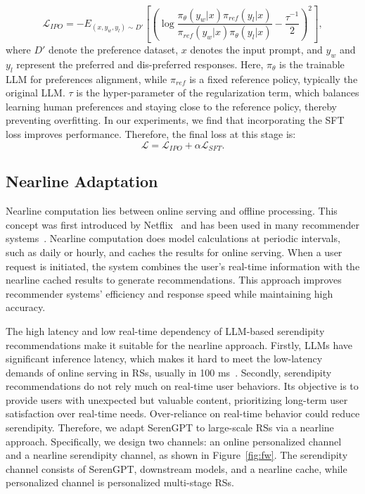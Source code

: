 \begin{equation}
    \mathcal{L}_{IPO}=-E_{(x,y_w,y_l)\sim D'}\left[\left(\log\frac{\pi_\theta(y_w|x)\pi_{ref}(y_l|x)}{\pi_{ref}(y_w|x)\pi_{\theta}(y_l|x)} - \frac{\tau^{-1}}{2}\right)^2\right],
    \label{eq:ipo}
\end{equation}
where $D'$ denote the preference dataset,  $x$ denotes the input prompt, and $y_w$ and $y_l$ represent the preferred and dis-preferred responses. Here,  $\pi_{\theta}$ is the trainable LLM for preferences alignment, while $\pi_{ref}$ is a fixed reference policy, typically the original LLM. $\tau$ is the hyper-parameter of the regularization term, which balances learning human preferences and staying close to the reference policy, thereby preventing overfitting. In our experiments, we find that incorporating the SFT loss improves performance. Therefore, the final loss at this stage is:
\begin{equation}
    \mathcal{L} = \mathcal{L}_{IPO} +\alpha \mathcal{L}_{SFT}.
    \label{eq:final_ipo}
\end{equation}

\subsection{Nearline Adaptation}\label{sec:downstream} Nearline computation lies between online serving and offline processing. This concept was first introduced by Netflix~\cite{amatriain2013big,amatriain2013system} and has been used in many recommender systems~\cite{ma2024simple,borisyuk2024lignn,li2021truncation}. Nearline computation does model calculations at periodic intervals, such as daily or hourly, and caches the results for online serving. When a user request is initiated, the system combines the user's real-time information with the nearline cached results to generate recommendations. This approach improves recommender systems' efficiency and response speed while maintaining high accuracy.

The high latency and low real-time dependency of LLM-based serendipity recommendations make it suitable for the nearline approach. Firstly, LLMs have significant inference latency, which makes it hard to meet the low-latency demands of online serving in RSs, usually in 100 ms~\cite{xi2023device}. Secondly, serendipity recommendations do not rely much on real-time user behaviors. Its objective is to provide users with unexpected but valuable content, prioritizing long-term user satisfaction over real-time needs. Over-reliance on real-time behavior could reduce serendipity. Therefore, we adapt SerenGPT to large-scale RSs via a nearline approach. Specifically, we design two channels: an online personalized channel and a nearline serendipity channel, as shown in Figure~\ref{fig:fw}. The serendipity channel consists of SerenGPT, downstream models, and a nearline cache, while personalized channel is personalized multi-stage RSs.

